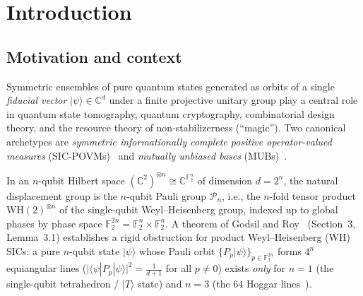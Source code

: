 \documentclass[11pt,a4paper]{article}
\theoremstyle{plain}
\theoremstyle{definition}
\theoremstyle{remark}
\newcommand{\C}{\mathbb{C}}
\newcommand{\F}{\mathbb{F}}
\newcommand{\Pauli}{\mathcal{P}}
\newcommand{\ket}[1]{|#1\rangle}
\newcommand{\expval}[2]{\langle#1|#2|#1\rangle}
\newcommand{\abs}[1]{\lvert#1\rvert}
\numberwithin{equation}{section}
\begin{document}
\vspace*{-1.5ex}
\setcounter{tocdepth}{1}
{\small\setlength{\parskip}{0pt}%
\makeatletter
\renewcommand{\l@section}[2]{%
  \ifnum \c@tocdepth >\z@
    \addpenalty\@secpenalty
    \addvspace{0.18em \@plus\p@}%
    \setlength\@tempdima{1.5em}%
    \begingroup
      \parindent \z@ \rightskip \@pnumwidth
      \parfillskip -\@pnumwidth
      \leavevmode \bfseries
      \advance\leftskip\@tempdima
      \hskip -\leftskip
      #1\nobreak\hfil \nobreak\hb@xt@\@pnumwidth{\hss #2}\par
    \endgroup
  \fi}
\makeatother
\tableofcontents}
\clearpage

\section{Introduction}\label{sec:intro}

\subsection{Motivation and context}

Symmetric ensembles of pure quantum states generated as orbits of a single \emph{fiducial vector} $\ket{\psi} \in \C^d$ under a finite projective unitary group play a central role in quantum state tomography, quantum cryptography, combinatorial design theory, and the resource theory of non-stabilizerness (``magic''). Two canonical archetypes are \emph{symmetric informationally complete positive operator-valued measures} (SIC-POVMs)~\cite{zauner2011quantum,renes2004symmetric} and \emph{mutually unbiased bases} (MUBs)~\cite{ivanovic1981geometrical,wootters1989optimal,bandyopadhyay2002new,klappenecker2005mutually,durt2010mutually,zhu2015mutually}.

In an $n$-qubit Hilbert space $(\C^2)^{\otimes n} \cong \C^{\F_2^n}$ of dimension $d = 2^n$, the natural displacement group is the $n$-qubit Pauli group $\Pauli_n$, i.e., the $n$-fold tensor product $\mathrm{WH}(2)^{\otimes n}$ of the single-qubit Weyl--Heisenberg group, indexed up to global phases by phase space $\F_2^{2n} = \F_2^n \times \F_2^n$. A theorem of Godsil and Roy~\cite{godsil2009equiangular} (Section~3, Lemma~3.1) establishes a rigid obstruction for product Weyl--Heisenberg (WH) SICs: a pure $n$-qubit state $\ket{\psi}$ whose Pauli orbit $\{P_p\ket{\psi}\}_{p \in \F_2^{2n}}$ forms $4^n$ equiangular lines ($\abs{\expval{\psi}{P_p}}^2 = \frac{1}{d+1}$ for all $p \neq 0$) exists \emph{only} for $n = 1$ (the single-qubit tetrahedron / $\ket{T}$ state) and $n = 3$ (the $64$ Hoggar lines~\cite{hoggar1998lines}).
\end{document}

